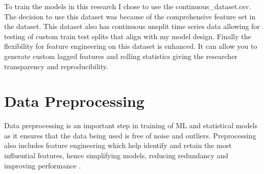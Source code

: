 To train the models in this research I chose to use the continuous\_dataset.csv. The decision to use this dataset was because of the comprehensive feature set in the dataset. This dataset also has continuous unsplit time series data allowing for testing of custom train test splits that align with my model design. Finally the flexibility for feature engineering on this dataset is enhanced. It can allow you to generate custom lagged features and rolling statistics giving the researcher transparency and reproducibility.

\section{Data Preprocessing}

Data preprocessing is an important step in training of ML and statistical models as it ensures that the data being used is free of noise and outliers. Preprocessing also includes feature engineering which help identify and retain the most influential features, hence simplifying models, reducing redundancy and improving performance \cite{gao2021cooling}.

